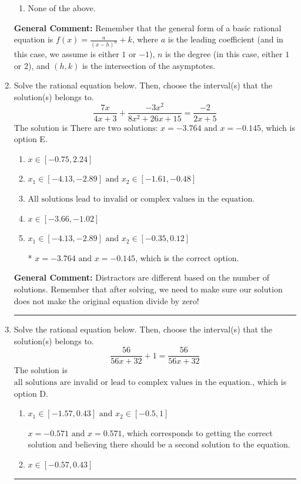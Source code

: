 \documentclass{extbook}[14pt]
\newcommand{\litem}[1]{\item #1

\rule{\textwidth}{0.4pt}}
\begin{document}
\begin{enumerate}
{\begin{enumerate}[label=\Alph*.]
\begin{multicols}{2}
\end{multicols}\item None of the above.\end{enumerate}
\textbf{General Comment:} Remember that the general form of a basic rational equation is $ f(x) = \frac{a}{(x-h)^n} + k$, where $a$ is the leading coefficient (and in this case, we assume is either $1$ or $-1$), $n$ is the degree (in this case, either $1$ or $2$), and $(h, k)$ is the intersection of the asymptotes.
}
\litem{
Solve the rational equation below. Then, choose the interval(s) that the solution(s) belongs to.
\[ \frac{7x}{4x + 3} + \frac{-3x^{2}}{8x^{2} +26 x + 15} = \frac{-2}{2x + 5} \]
The solution is \( \text{There are two solutions: } x = -3.764 \text{ and } x = -0.145 \), which is option E.\begin{enumerate}[label=\Alph*.]
\item \( x \in [-0.75,2.24] \)


\item \( x_1 \in [-4.13, -2.89] \text{ and } x_2 \in [-1.61,-0.48] \)


\item \( \text{All solutions lead to invalid or complex values in the equation.} \)


\item \( x \in [-3.66,-1.02] \)


\item \( x_1 \in [-4.13, -2.89] \text{ and } x_2 \in [-0.35,0.12] \)

* $x = -3.764 \text{ and } x = -0.145$, which is the correct option.
\end{enumerate}

\textbf{General Comment:} Distractors are different based on the number of solutions. Remember that after solving, we need to make sure our solution does not make the original equation divide by zero!
}
\litem{
Solve the rational equation below. Then, choose the interval(s) that the solution(s) belongs to.
\[ \frac{56}{56x + 32} + 1 = \frac{56}{56x + 32} \]
The solution is \( \text{all solutions are invalid or lead to complex values in the equation.} \), which is option D.\begin{enumerate}[label=\Alph*.]
\item \( x_1 \in [-1.57, 0.43] \text{ and } x_2 \in [-0.5,1] \)

$x = -0.571 \text{ and } x = 0.571$, which corresponds to getting the correct solution and believing there should be a second solution to the equation.
\item \( x \in [-0.57,0.43] \)


\end{enumerate}}
\end{enumerate}
\end{document}
